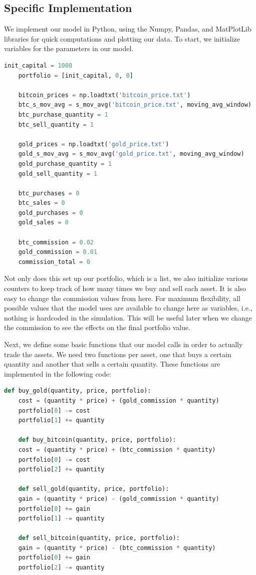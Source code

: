 \documentclass[12pt]{article}
\begin{document}
\subsection{Specific Implementation}
We implement our model in Python, using the Numpy, Pandas, and MatPlotLib libraries for quick computations and plotting our data. To start, we initialize
variables for the parameters in our model.
\\
\begin{lstlisting}[language=Python]
    init_capital = 1000
    portfolio = [init_capital, 0, 0]

    bitcoin_prices = np.loadtxt('bitcoin_price.txt')
    btc_s_mov_avg = s_mov_avg('bitcoin_price.txt', moving_avg_window)
    btc_purchase_quantity = 1
    btc_sell_quantity = 1

    gold_prices = np.loadtxt('gold_price.txt')
    gold_s_mov_avg = s_mov_avg('gold_price.txt', moving_avg_window)
    gold_purchase_quantity = 1
    gold_sell_quantity = 1

    btc_purchases = 0
    btc_sales = 0
    gold_purchases = 0
    gold_sales = 0

    btc_commission = 0.02
    gold_commission = 0.01
    commission_total = 0
\end{lstlisting}
Not only does this set up our portfolio, which is a list, we also initialize various counters to keep track of how many times we buy and sell
each asset. It is also easy to change the commission values from here. For maximum flexibility, all possible values that the model uses are available to change here as variables, i.e.,
nothing is hardcoded in the simulation. This will be useful later when we change the commission to see the effects on the final portfolio value.

Next, we define some basic functions that our model calls in order to actually trade the assets. We need two functions per asset, one that buys a certain quantity and another that sells a certain quantity.
These functions are implemented in the following code:
\\
\begin{lstlisting}[language=Python]
    def buy_gold(quantity, price, portfolio):
    cost = (quantity * price) + (gold_commission * quantity)
    portfolio[0] -= cost
    portfolio[1] += quantity

    def buy_bitcoin(quantity, price, portfolio):
    cost = (quantity * price) + (btc_commission * quantity)
    portfolio[0] -= cost
    portfolio[2] += quantity

    def sell_gold(quantity, price, portfolio):
    gain = (quantity * price) - (gold_commission * quantity)
    portfolio[0] += gain
    portfolio[1] -= quantity

    def sell_bitcoin(quantity, price, portfolio):
    gain = (quantity * price) - (btc_commission * quantity)
    portfolio[0] += gain
    portfolio[2] -= quantity
\end{lstlisting}
\end{document}
